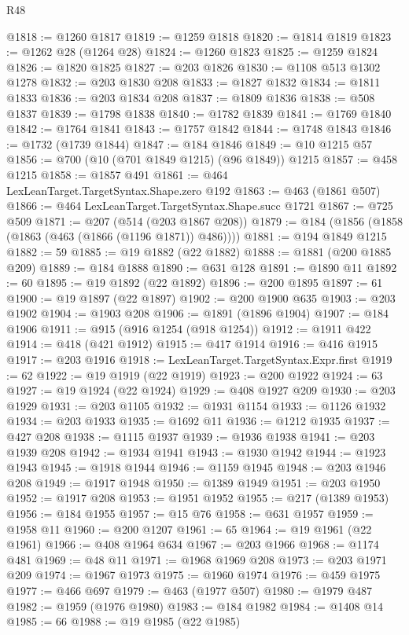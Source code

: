 \begin{lexlean}{R48}
\begin{coremodule}
@1818 := @1260 @1817
@1819 := @1259 @1818
@1820 := @1814 @1819
@1823 := @1262 @28 (@1264 @28)
@1824 := @1260 @1823
@1825 := @1259 @1824
@1826 := @1820 @1825
@1827 := @203 @1826
@1830 := @1108 @513 @1302 @1278
@1832 := @203 @1830 @208
@1833 := @1827 @1832
@1834 := @1811 @1833
@1836 := @203 @1834 @208
@1837 := @1809 @1836
@1838 := @508 @1837
@1839 := @1798 @1838
@1840 := @1782 @1839
@1841 := @1769 @1840
@1842 := @1764 @1841
@1843 := @1757 @1842
@1844 := @1748 @1843
@1846 := @1732 (@1739 @1844)
@1847 := @184 @1846
@1849 := @10 @1215 @57
@1856 := @700 (@10 (@701 @1849 @1215) (@96 @1849)) @1215
@1857 := @458 @1215
@1858 := @1857 @491
@1861 := @464 LexLeanTarget.TargetSyntax.Shape.zero @192
@1863 := @463 (@1861 @507)
@1866 := @464 LexLeanTarget.TargetSyntax.Shape.succ @1721
@1867 := @725 @509
@1871 := @207 (@514 (@203 @1867 @208))
@1879 := @184 (@1856 (@1858 (@1863 (@463 (@1866 (@1196 @1871)) @486))))
@1881 := @194 @1849 @1215
@1882 := 59
@1885 := @19 @1882 (@22 @1882)
@1888 := @1881 (@200 @1885 @209)
@1889 := @184 @1888
@1890 := @631 @128
@1891 := @1890 @11
@1892 := 60
@1895 := @19 @1892 (@22 @1892)
@1896 := @200 @1895
@1897 := 61
@1900 := @19 @1897 (@22 @1897)
@1902 := @200 @1900 @635
@1903 := @203 @1902
@1904 := @1903 @208
@1906 := @1891 (@1896 @1904)
@1907 := @184 @1906
@1911 := @915 (@916 @1254 (@918 @1254))
@1912 := @1911 @422
@1914 := @418 (@421 @1912)
@1915 := @417 @1914
@1916 := @416 @1915
@1917 := @203 @1916
@1918 := LexLeanTarget.TargetSyntax.Expr.first
@1919 := 62
@1922 := @19 @1919 (@22 @1919)
@1923 := @200 @1922
@1924 := 63
@1927 := @19 @1924 (@22 @1924)
@1929 := @408 @1927 @209
@1930 := @203 @1929
@1931 := @203 @1105
@1932 := @1931 @1154
@1933 := @1126 @1932
@1934 := @203 @1933
@1935 := @1692 @11
@1936 := @1212 @1935
@1937 := @427 @208
@1938 := @1115 @1937
@1939 := @1936 @1938
@1941 := @203 @1939 @208
@1942 := @1934 @1941
@1943 := @1930 @1942
@1944 := @1923 @1943
@1945 := @1918 @1944
@1946 := @1159 @1945
@1948 := @203 @1946 @208
@1949 := @1917 @1948
@1950 := @1389 @1949
@1951 := @203 @1950
@1952 := @1917 @208
@1953 := @1951 @1952
@1955 := @217 (@1389 @1953)
@1956 := @184 @1955
@1957 := @15 @76
@1958 := @631 @1957
@1959 := @1958 @11
@1960 := @200 @1207
@1961 := 65
@1964 := @19 @1961 (@22 @1961)
@1966 := @408 @1964 @634
@1967 := @203 @1966
@1968 := @1174 @481
@1969 := @48 @11
@1971 := @1968 @1969 @208
@1973 := @203 @1971 @209
@1974 := @1967 @1973
@1975 := @1960 @1974
@1976 := @459 @1975
@1977 := @466 @697
@1979 := @463 (@1977 @507)
@1980 := @1979 @487
@1982 := @1959 (@1976 @1980)
@1983 := @184 @1982
@1984 := @1408 @14
@1985 := 66
@1988 := @19 @1985 (@22 @1985)

\end{coremodule}
\end{lexlean}

